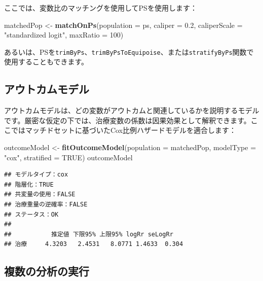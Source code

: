 \documentclass[
  11pt]{book}
\newenvironment{Shaded}{\begin{snugshade}}{\end{snugshade}}
\newcommand{\AttributeTok}[1]{\textcolor[rgb]{0.13,0.29,0.53}{#1}}
\newcommand{\ConstantTok}[1]{\textcolor[rgb]{0.56,0.35,0.01}{#1}}
\newcommand{\DecValTok}[1]{\textcolor[rgb]{0.00,0.00,0.81}{#1}}
\newcommand{\FloatTok}[1]{\textcolor[rgb]{0.00,0.00,0.81}{#1}}
\newcommand{\FunctionTok}[1]{\textcolor[rgb]{0.13,0.29,0.53}{\textbf{#1}}}
\newcommand{\NormalTok}[1]{#1}
\newcommand{\OtherTok}[1]{\textcolor[rgb]{0.56,0.35,0.01}{#1}}
\newcommand{\StringTok}[1]{\textcolor[rgb]{0.31,0.60,0.02}{#1}}
\theoremstyle{definition}
\theoremstyle{definition}
\theoremstyle{definition}
\theoremstyle{definition}
\theoremstyle{remark}
\begin{document}
ここでは、変数比のマッチングを使用してPSを使用します：

\begin{Shaded}
\begin{Highlighting}[]
\NormalTok{matchedPop }\OtherTok{\textless{}{-}} \FunctionTok{matchOnPs}\NormalTok{(}\AttributeTok{population =}\NormalTok{ ps, }\AttributeTok{caliper =} \FloatTok{0.2}\NormalTok{,}
                        \AttributeTok{caliperScale =} \StringTok{"standardized logit"}\NormalTok{, }\AttributeTok{maxRatio =} \DecValTok{100}\NormalTok{)}
\end{Highlighting}
\end{Shaded}

あるいは、PSを\texttt{trimByPs}、\texttt{trimByPsToEquipoise}、または\texttt{stratifyByPs}関数で使用することもできます。

\subsection{アウトカムモデル}\label{ux30a2ux30a6ux30c8ux30abux30e0ux30e2ux30c7ux30eb}

アウトカムモデルは、どの変数がアウトカムと関連しているかを説明するモデルです。厳密な仮定の下では、治療変数の係数は因果効果として解釈できます。ここではマッチドセットに基づいたCox比例ハザードモデルを適合します：

\begin{Shaded}
\begin{Highlighting}[]
\NormalTok{outcomeModel }\OtherTok{\textless{}{-}} \FunctionTok{fitOutcomeModel}\NormalTok{(}\AttributeTok{population =}\NormalTok{ matchedPop,}
                                \AttributeTok{modelType =} \StringTok{"cox"}\NormalTok{,}
                                \AttributeTok{stratified =} \ConstantTok{TRUE}\NormalTok{)}
\NormalTok{outcomeModel}
\end{Highlighting}
\end{Shaded}

\begin{verbatim}
## モデルタイプ：cox
## 階層化：TRUE
## 共変量の使用：FALSE
## 治療重量の逆確率：FALSE
## ステータス：OK
## 
##           推定値 下限95% 上限95% logRr seLogRr
## 治療     4.3203   2.4531   8.0771 1.4633  0.304
\end{verbatim}

\subsection{複数の分析の実行}\label{MultipleAnalyses}
\end{document}

